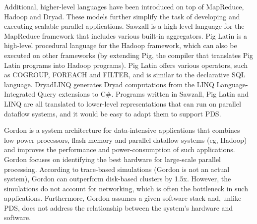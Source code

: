 \documentclass{acm_proc_article-sp}
\begin{document}
Additional, higher-level languages have been introduced on top of MapReduce, Hadoop and Dryad. These models further simplify the task of developing and executing scalable parallel applications. Sawzall \cite{sawzall} is a high-level language for the MapReduce framework that includes various built-in aggregators. Pig Latin \cite{piglatin} is a high-level procedural language for the Hadoop framework, which can also be executed on other frameworks (by extending Pig, the compiler that translates Pig Latin programs into Hadoop programs). Pig Latin offers various operators, such as COGROUP, FOREACH and FILTER, and is similar to the declarative SQL language. DryadLINQ \cite{dryadlinq} generates Dryad computations from the LINQ Language-Integrated Query extensions to C\#. Programs written in Sawzall, Pig Latin and LINQ are all translated to lower-level representations that can run on parallel dataflow systems, and it would be easy to adapt them to support PDS.

Gordon \cite{gordon} is a system architecture for data-intensive applications that combines low-power processors, flash memory and parallel dataflow systems (eg, Hadoop) and improves the performance and power-consumption of such applications. Gordon focuses on identifying the best hardware for large-scale parallel processing. According to trace-based simulations (Gordon is not an actual system), Gordon can outperform disk-based clusters by 1.5x. However, the simulations do not account for networking, which is often the bottleneck in such applications. Furthermore, Gordon assumes a given software stack and, unlike PDS, does not address the relationship between the system's hardware and software.




\balancecolumns
\end{document}

